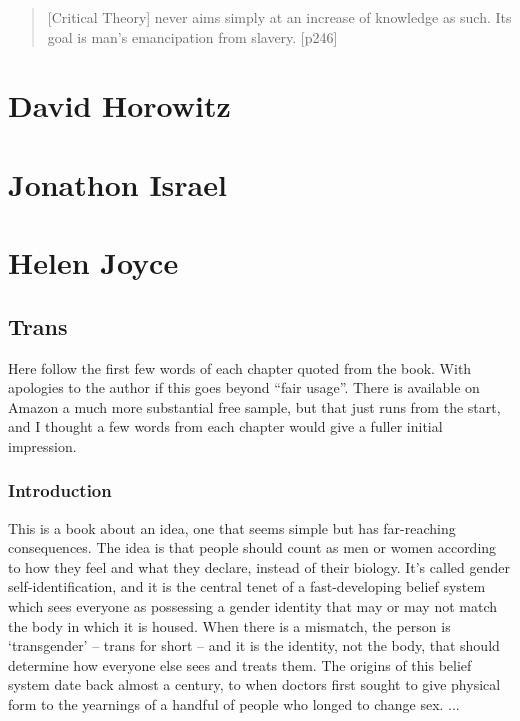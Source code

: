 \documentclass[10pt,titlepage]{book}
\begin{document}
\begin{quote}
  [Critical Theory] never aims simply at an increase of knowledge as such. Its goal is man's emancipation from slavery. [p246]
\end{quote}

\section{David Horowitz}

\cite{horowitz-paau,horowitz-bbal}

\section{Jonathon Israel}


\section{Helen Joyce}

\subsection{Trans \cite{joyce2021}}
Here follow the first few words of each chapter quoted from the book.
With apologies to the author if this goes beyond ``fair usage''.
There is available on Amazon a much more substantial free sample, but that just runs from the start, and I thought a few words from each chapter would give a fuller initial impression.

\subsubsection{Introduction}

This is a book about an idea, one that seems simple but has far-reaching consequences. The idea is that people should count as men or women according to how they feel and what they declare, instead of their biology. It’s called gender self-identification, and it is the central tenet of a fast-developing belief system which sees everyone as possessing a gender identity that may or may not match the body in which it is housed. When there is a mismatch, the person is ‘transgender’ – trans for short – and it is the identity, not the body, that should determine how everyone else sees and treats them. The origins of this belief system date back almost a century, to when doctors first sought to give physical form to the yearnings of a handful of people who longed to change sex.
...
\end{document}
